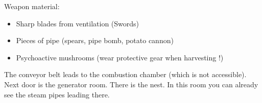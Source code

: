 Weapon material:

\begin{itemize}
\item Sharp blades from ventilation (Swords)
\item Pieces of pipe (spears, pipe bomb, potato cannon)
\item Psychoactive mushrooms (wear protective gear when harvesting !)
\end{itemize}


The conveyor belt leads to the combustion chamber (which is not accessible). Next door is the generator room. There is the nest.
In this room you can already see the steam pipes leading there.

\begin{npcBox}[title=Lucien\, Director]

    \begin{aspects}
    \item {}
    \item {}
    \end{aspects}

    \begin{skills}
    \item {}
    \item {}
    \item {}
    \item {}
    \item {}
    \item {}
    \item {}
    \item {}
    \item {}
    \item {}
    \item {}
    \item {}
    \item {}
    \item {}
    \item {}
    \item {}
    \item {}
    \item {}
    \item {}
    \end{skills}


\end{npcBox}
